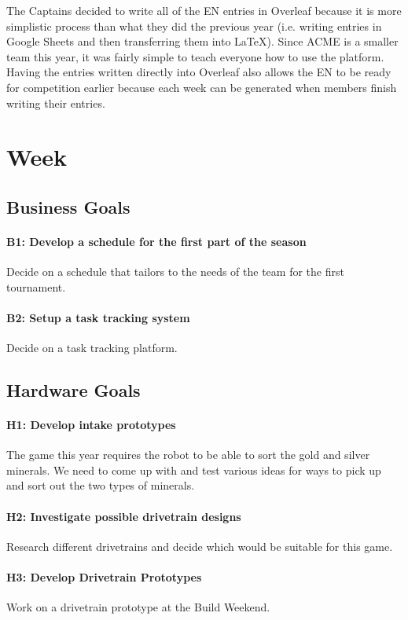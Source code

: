 \documentclass{article}
\begin{document}
The Captains decided to write all of the EN entries in Overleaf because it is more simplistic process than what they did the previous year (i.e. writing entries in Google Sheets and then transferring them into \LaTeX). Since ACME is a smaller team this year, it was fairly simple to teach everyone how to use the platform. Having the entries written directly into Overleaf also allows the EN to be ready for competition earlier because each week can be generated when members finish writing their entries. 
\clearpage \newpage \section{Week \thesection} 
\subsection{Business Goals}
\paragraph{B1: Develop a schedule for the first part of the season}
 Decide on a schedule that tailors to the needs of the team for the first tournament.
\paragraph{B2: Setup a task tracking system}
 Decide on a task tracking platform.
\subsection{Hardware Goals}
\paragraph{H1: Develop intake prototypes}
The game this year requires the robot to be able to sort the gold and silver minerals. We need to come up with and test various ideas for ways to pick up and sort out the two types of minerals.
\paragraph{H2: Investigate possible drivetrain designs}
 Research different drivetrains and decide which would be suitable for this game.
\paragraph{H3: Develop Drivetrain Prototypes}
 Work on a drivetrain prototype at the Build Weekend.
\end{document}
